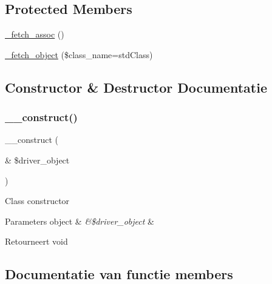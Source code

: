 \subsection*{Protected Members}
\begin{DoxyCompactItemize}
\item 
\mbox{\hyperlink{class_c_i___d_b__oci8__result_a43a9a92817f1334a1c10752ec44275a0}{\+\_\+fetch\+\_\+assoc}} ()
\item 
\mbox{\hyperlink{class_c_i___d_b__oci8__result_a60806be6a9c2488820813c2a7f4fef71}{\+\_\+fetch\+\_\+object}} (\$class\+\_\+name=\textquotesingle{}std\+Class\textquotesingle{})
\end{DoxyCompactItemize}


\subsection{Constructor \& Destructor Documentatie}
\mbox{\label{class_c_i___d_b__oci8__result_a8e093c8b6e5733bc3f306385ee426ab7}} 
\subsubsection{\texorpdfstring{\_\_construct()}{\_\_construct()}}
{\footnotesize\ttfamily \+\_\+\+\_\+construct (\begin{DoxyParamCaption}\item[{\&}]{\$driver\+\_\+object }\end{DoxyParamCaption})}

Class constructor


\begin{DoxyParams}[1]{Parameters}
object & {\em \&\$driver\+\_\+object} & \\
\hline
\end{DoxyParams}
\begin{DoxyReturn}{Retourneert}
void 
\end{DoxyReturn}


\subsection{Documentatie van functie members}
\mbox{\label{class_c_i___d_b__oci8__result_a43a9a92817f1334a1c10752ec44275a0}} 
